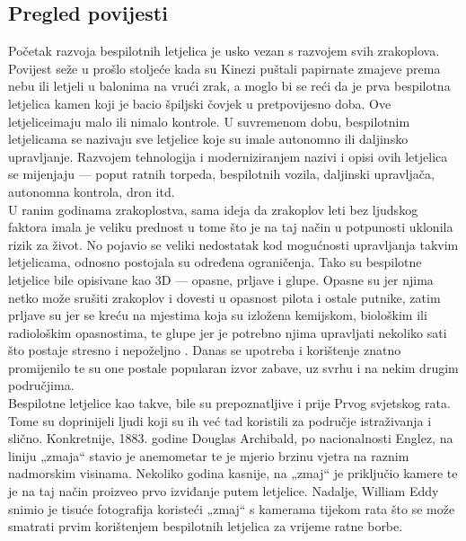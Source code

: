 \documentclass[times, utf8, diplomski]{fer}
\begin{document}
\subsection{Pregled povijesti}
Početak razvoja bespilotnih letjelica je usko vezan s razvojem svih zrakoplova. Povijest seže u prošlo stoljeće kada su Kinezi puštali papirnate zmajeve prema nebu ili letjeli u balonima na vrući zrak, a moglo bi se reći da je prva bespilotna letjelica kamen koji je bacio špiljski čovjek u pretpovijesno doba. Ove \glqq letjelice\grqq imaju malo ili nimalo kontrole. U suvremenom dobu, bespilotnim letjelicama se nazivaju sve letjelice koje su imale autonomno ili daljinsko upravljanje. Razvojem tehnologija i moderniziranjem nazivi i opisi ovih letjelica se mijenjaju --- poput ratnih torpeda, bespilotnih vozila, daljinski upravljača, autonomna kontrola, dron itd.\\
U ranim godinama zrakoplostva, sama ideja da zrakoplov leti bez ljudskog faktora imala je veliku prednost u tome što je na taj način u potpunosti uklonila rizik za život. No pojavio se veliki nedostatak kod mogućnosti upravljanja takvim letjelicama, odnosno postojala su određena ograničenja. Tako su bespilotne letjelice bile opisivane kao 3D  --- opasne, prljave i glupe. Opasne su jer njima netko može srušiti zrakoplov i dovesti u opasnost pilota i ostale putnike, zatim prljave su jer se kreću na mjestima koja su izložena kemijskom, biološkim ili radiološkim opasnostima, te glupe jer je potrebno njima upravljati nekoliko sati što postaje stresno i nepoželjno \citep{unmannedAircraftSystem}. Danas se upotreba i korištenje znatno promijenilo te su one postale popularan izvor zabave, uz svrhu i na nekim drugim područjima.\\
Bespilotne letjelice kao takve, bile su prepoznatljive i prije Prvog svjetskog rata. Tome su  doprinijeli ljudi koji su ih već tad koristili za područje istraživanja i slično. Konkretnije, 1883.  godine  Douglas  Archibald, po  nacionalnosti Englez,  na liniju  „zmaja“  stavio  je anemometar  te  je  mjerio  brzinu  vjetra  na  raznim  nadmorskim  visinama. Nekoliko  godina kasnije, na „zmaj“ je priključio kamere te je na taj način proizveo prvo izviđanje putem letjelice. Nadalje, William Eddy snimio je tisuće fotografija koristeći „zmaj“ s kamerama tijekom rata što se može smatrati prvim korištenjem bespilotnih letjelica za vrijeme ratne borbe\citep{UAVSystems}.\\
\end{document}
